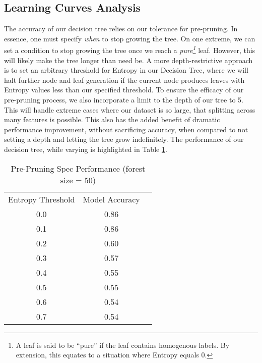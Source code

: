 \documentclass[letterpaper,12pt]{article}
\begin{document}
\subsection{Learning Curves Analysis}
The accuracy of our decision tree relies on our tolerance for pre-pruning.  In essence, one must specify \emph{when} to stop growing the tree.  On one extreme, we can set a condition to stop growing the tree once we reach a \emph{pure\footnote{A leaf is said to be ``pure'' if the leaf contains homogenous labels.  By extension, this equates to a situation where Entropy equals 0.}} leaf.  However, this will likely make the tree longer than need be.  A more depth-restrictive approach is to set an arbitrary threshold for Entropy in our Decision Tree, where we will halt further node and leaf generation if the current node produces leaves with Entropy values less than our specified threshold.  To ensure the efficacy of our pre-pruning process, we also incorporate a limit to the depth of our tree to 5.  This will handle extreme cases where our dataset is so large, that splitting across many features is possible. This also has the added benefit of dramatic performance improvement, without sacrificing accuracy, when compared to not setting a depth and letting the tree grow indefinitely.  The performance of our decision tree, while varying  is highlighted in Table \ref{table:PrePruningTable}.

\begin{table}[htb]
  \caption{Pre-Pruning Spec Performance (forest size = 50)}
  \label{table:PrePruningTable}
  \centering
  \begin{tabular}{|c|c|c|}
  
    \hline
    \hline
    \multicolumn{1}{c}{Entropy Threshold}
    &  \multicolumn{1}{c}{Model Accuracy} \\
    \cline{1-2}
    0.0 & 0.86 \\
    \cline{1-2}
    0.1 & 0.86 \\
    \cline{1-2}
    0.2 & 0.60 \\
    \cline{1-2}
    0.3 & 0.57 \\
    \cline{1-2}
    0.4 & 0.55 \\
    \cline{1-2}
    0.5 & 0.55 \\
    \cline{1-2}
    0.6 & 0.54 \\
    \cline{1-2}
    0.7 & 0.54 \\
    
    
    \cline{1-2}
  \end{tabular}
\end{table}
\end{document}
